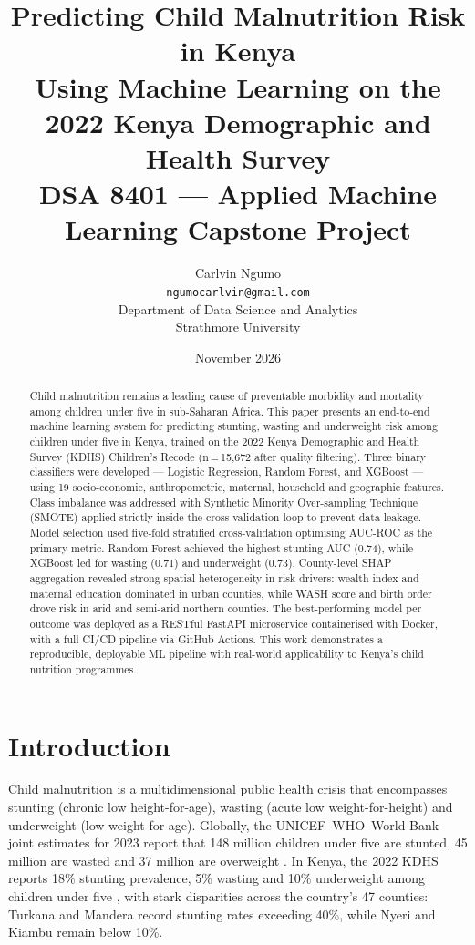 \documentclass[12pt, a4paper]{article}
\title{%
    \vspace{-1cm}
    {\LARGE\bfseries Predicting Child Malnutrition Risk in Kenya} \\[0.5em]
    {\large Using Machine Learning on the 2022 Kenya Demographic and Health Survey} \\[1em]
    {\normalsize DSA 8401 — Applied Machine Learning Capstone Project}
}
\author{
    Carlvin Ngumo \\
    \texttt{ngumocarlvin@gmail.com} \\[0.3em]
    \normalsize Department of Data Science and Analytics \\
    \normalsize Strathmore University
}
\date{November 2026}
\begin{document}
\maketitle
\thispagestyle{empty}

\begin{abstract}
Child malnutrition remains a leading cause of preventable morbidity and
mortality among children under five in sub-Saharan Africa. This paper
presents an end-to-end machine learning system for predicting stunting,
wasting and underweight risk among children under five in Kenya, trained
on the 2022 Kenya Demographic and Health Survey (KDHS) Children's Recode
(n\,=\,15,672 after quality filtering). Three binary classifiers were
developed — Logistic Regression, Random Forest, and XGBoost — using 19
socio-economic, anthropometric, maternal, household and geographic
features. Class imbalance was addressed with Synthetic Minority
Over-sampling Technique (SMOTE) applied strictly inside the cross-validation
loop to prevent data leakage. Model selection used five-fold stratified
cross-validation optimising AUC-ROC as the primary metric. Random Forest
achieved the highest stunting AUC (0.74), while XGBoost led for wasting
(0.71) and underweight (0.73). County-level SHAP aggregation revealed
strong spatial heterogeneity in risk drivers: wealth index and maternal
education dominated in urban counties, while WASH score and birth order
drove risk in arid and semi-arid northern counties. The best-performing
model per outcome was deployed as a RESTful FastAPI microservice
containerised with Docker, with a full CI/CD pipeline via GitHub Actions.
This work demonstrates a reproducible, deployable ML pipeline with
real-world applicability to Kenya's child nutrition programmes.
\end{abstract}

\newpage
\tableofcontents
\newpage

\section{Introduction}
\label{sec:intro}

Child malnutrition is a multidimensional public health crisis that
encompasses stunting (chronic low height-for-age), wasting (acute low
weight-for-height) and underweight (low weight-for-age). Globally, the
UNICEF–WHO–World Bank joint estimates for 2023 report that 148 million
children under five are stunted, 45 million are wasted and 37 million are
overweight \citep{UNICEF2023}. In Kenya, the 2022 KDHS reports 18\% stunting
prevalence, 5\% wasting and 10\% underweight among children under five
\citep{KNBS2023}, with stark disparities across the country's 47 counties:
Turkana and Mandera record stunting rates exceeding 40\%, while Nyeri and
Kiambu remain below 10\%.
\end{document}
